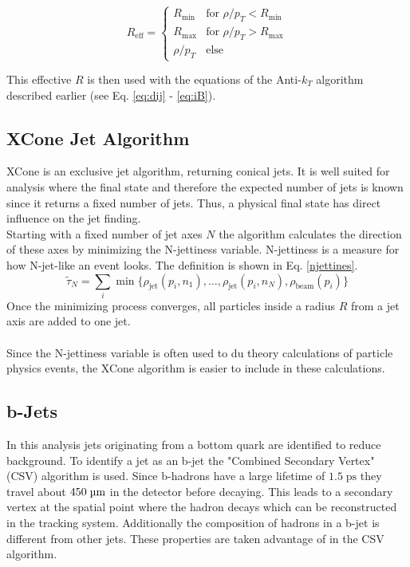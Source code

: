 	\begin{equation}
	\label{eq:HOTVR}
	  R_\text{eff} =
	   \begin{cases}
	     R_\text{min} & \text{for } \rho / p_T < R_\text{min} \\
	     R_\text{max} & \text{for } \rho / p_T > R_\text{max} \\
	     \rho / p_T & \text{else}  
	   \end{cases}
	\end{equation}
	
	\noindent This effective $R$ is then used with the equations of the Anti-$k_T$ algorithm described earlier (see Eq. \ref{eq:dij} - \ref{eq:iB}).

\subsection{XCone Jet Algorithm}
\label{sec:xcone}
	XCone \cite{xcone} is an exclusive jet algorithm, returning conical jets. It is well suited for analysis where the final state and therefore the expected number of jets is known since it returns a fixed number of jets. Thus, a physical final state has direct influence on the jet finding. \\
	Starting with a fixed number of jet axes $N$ the algorithm calculates the direction of these axes by minimizing the N-jettiness variable. N-jettiness is a measure for how N-jet-like an event looks. The definition is shown in Eq. \ref{njettines}.
	\begin{equation}
	\tilde{\tau}_N = \sum_i \min\{\rho_\text{jet}(p_i, n_1), \dots, \rho_\text{jet}(p_i, n_N), \rho_\text{beam}(p_i)\}
	\label{njettines}
	\end{equation}
	Once the minimizing process converges, all particles inside a radius $R$ from a jet axis are added to one jet. \\	
	\\ Since the N-jettiness variable is often used to du theory calculations of particle physics events, the XCone algorithm is easier to include in these calculations.

\subsection{b-Jets}
	In this analysis jets originating from a bottom quark are identified to reduce background. To identify a jet as an b-jet the "Combined Secondary Vertex" (CSV) algorithm is used. Since b-hadrons have a large lifetime of $1.5\;\text{ps}$ they travel about $450\;\text{\textmu m}$ in the detector before decaying. This leads to a secondary vertex at the spatial point where the hadron decays which can be reconstructed in the tracking system. Additionally the composition of hadrons in a b-jet is different from other jets.
	These properties are taken advantage of in the CSV algorithm. 
	
